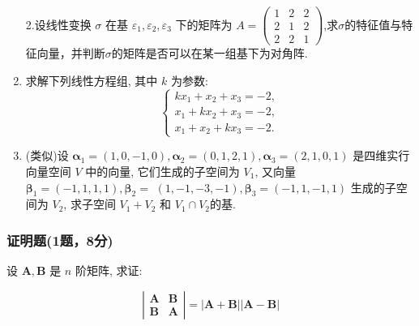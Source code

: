 \begin{enumerate}
    2.设线性变换 $\sigma$ 在基 $\varepsilon_1, \varepsilon_2 , \varepsilon_3$ 下的矩阵为 $A=\left(\begin{array}{ccc}1 & 2 & 2 \\ 2 & 1 & 2 \\ 2 & 2 & 1\end{array}\right)$,求$\sigma $的特征值与特征向量，并判断$\sigma $的矩阵是否可以在某一组基下为对角阵.
    \item 求解下列线性方程组, 其中 $k$ 为参数:
    \[
    \left\{\begin{array}{l}
    k x_1+x_2+x_3=-2, \\
    x_1+k x_2+x_3=-2, \\
    x_1+x_2+k x_3=-2 .
    \end{array}\right.
    \]
    \item (类似)设 $\boldsymbol{\alpha}_1=(1,0,-1,0), \boldsymbol{\alpha}_2=(0,1,2,1), \boldsymbol{\alpha}_3=(2,1,0,1)$ 是四维实行向量空间 $V$ 中的向量, 它们生成的子空间为 $V_1$, 又向量 $\boldsymbol{\beta}_1=(-1,1,1,1), \boldsymbol{\beta}_2=$ $(1,-1,-3,-1), \boldsymbol{\beta}_3=(-1,1,-1,1)$ 生成的子空间为 $V_2$, 求子空间 $V_1+V_2$ 和 $V_1 \cap V_2$的基.
\end{enumerate}

\subsubsection*{证明题(1题，8分)}
设 $\boldsymbol{A}, \boldsymbol{B}$ 是 $n$ 阶矩阵, 求证:

\[
\left|\begin{array}{ll}
\boldsymbol{A} & \boldsymbol{B} \\
\boldsymbol{B} & \boldsymbol{A}
\end{array}\right|=|\boldsymbol{A}+\boldsymbol{B}||\boldsymbol{A}-\boldsymbol{B}|
\]

